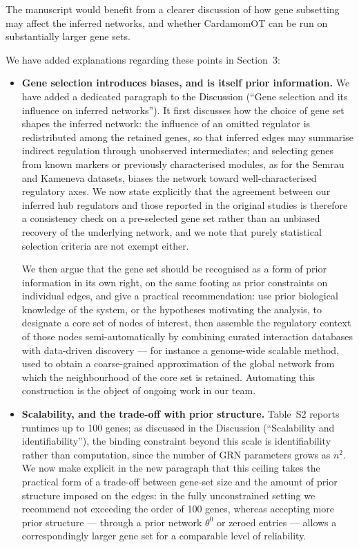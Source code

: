 \documentclass[11pt,a4paper]{article}
\newcounter{revtotal}   %
\newcounter{revlocal}   %
\newcommand{\currentreviewer}{}  %
\newcommand{\revcomment}[2]{%
  \stepcounter{revtotal}%
  \stepcounter{revlocal}%
  \edef\commentlabel{\currentreviewer.\arabic{revlocal}}%
  \begin{tcolorbox}[revstyle,
      title={\commentlabel\ $|$\ #1}]
    #2
  \end{tcolorbox}%
  \edef\lastcommentlabel{\commentlabel}%
}
\newcommand{\response}[1]{%
  \begin{tcolorbox}[respstyle,
      title={Response to \lastcommentlabel}]
    #1
  \end{tcolorbox}%
}
\begin{document}
\revcomment{Gene subset selection and possible selection bias}{%
The manuscript would benefit from a clearer discussion of how gene subsetting may affect
the inferred networks, and whether CardamomOT can be run on substantially larger gene
sets.}
\response{%
We have added explanations regarding these points in Section~3:
\begin{itemize}
  \item \textbf{Gene selection introduces biases, and is itself prior information.}
  We have added a dedicated paragraph to the Discussion (``Gene selection and its influence on
  inferred networks''). It first discusses how the choice of gene set shapes
  the inferred network: the influence of an omitted regulator is redistributed among the retained
  genes, so that inferred edges may summarise indirect regulation through unobserved
  intermediates; and selecting genes from known markers or previously characterised modules, as
  for the Semrau and Kameneva datasets, biases the network toward well-characterised regulatory
  axes. We now state explicitly that the agreement between our inferred hub regulators and those
  reported in the original studies is therefore a consistency check on a pre-selected gene set
  rather than an unbiased recovery of the underlying network, and we note that purely statistical
  selection criteria are not exempt either.

  We then argue that the gene set should be recognised as a form of prior information in its own
  right, on the same footing as prior constraints on individual edges, and give a practical
  recommendation: use prior biological knowledge of the system, or the hypotheses motivating the
  analysis, to designate a core set of nodes of interest, then assemble the regulatory context of
  those nodes semi-automatically by combining curated interaction databases with data-driven
  discovery --- for instance a genome-wide scalable method, used to obtain a
  coarse-grained approximation of the global network from which the neighbourhood of the core set
  is retained. Automating this construction is the object of ongoing work in our team.

  \item \textbf{Scalability, and the trade-off with prior structure.} Table~S2 reports runtimes
  up to 100 genes; as discussed in the Discussion (``Scalability and identifiability''), the
  binding constraint beyond this scale is identifiability rather than computation, since the
  number of GRN parameters grows as $n^2$. We now make explicit in the new paragraph that this
  ceiling takes the practical form of a trade-off between gene-set size and the amount of prior
  structure imposed on the edges: in the fully unconstrained setting we recommend not exceeding
  the order of 100 genes, whereas accepting more prior structure --- through a prior network
  $\theta^0$ or zeroed entries --- allows a correspondingly larger gene
  set for a comparable level of reliability.
\end{itemize}}
\end{document}
